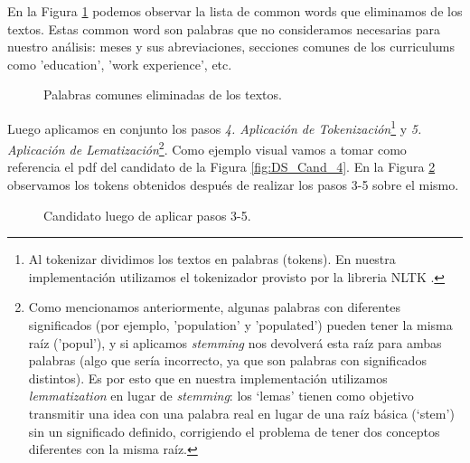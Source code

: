 \documentclass[12pt,a4paper]{article}
\begin{document}
\begin{sloppypar}
En la Figura \ref{fig:common_text} podemos observar la lista de common words que eliminamos de los textos. Estas common word son palabras que no consideramos necesarias para nuestro análisis: meses y sus abreviaciones, secciones comunes de los curriculums como 'education', 'work experience', etc. 
    
\begin{figure}[H] 
 \centering
 \noindent{}
 \caption{Palabras comunes eliminadas de los textos.} 
 \label{fig:common_text}
\end{figure}

Luego aplicamos en conjunto los pasos \textit{4. Aplicación de Tokenización}\footnote{Al tokenizar dividimos los textos en palabras (tokens). En nuestra implementación utilizamos el tokenizador provisto por la libreria NLTK .} y \textit{5. Aplicación de Lematización}\footnote{Como mencionamos anteriormente, algunas palabras con diferentes significados (por ejemplo, 'population' y 'populated') pueden tener la misma raíz ('popul'), y si aplicamos \textit{stemming} nos devolverá esta raíz para ambas palabras (algo que sería incorrecto, ya que son palabras con significados distintos). Es por esto que en nuestra implementación utilizamos \textit{lemmatization} en lugar de \textit{stemming}: los ‘lemas’ tienen como objetivo transmitir una idea con una palabra real en lugar de una raíz básica (‘stem’) sin un significado definido, corrigiendo el problema de tener dos conceptos diferentes con la misma raíz.}. Como ejemplo visual vamos a tomar como referencia el pdf del candidato de la Figura \ref{fig:DS_Cand_4}. En la Figura \ref{fig:tokens_obt} observamos los tokens obtenidos después de realizar los pasos 3-5 sobre el mismo. 

\begin{figure}[H] 
 \centering
 \noindent{}
 \caption{Candidato luego de aplicar pasos 3-5.} 
 \label{fig:tokens_obt}
\end{figure}


\end{sloppypar}
\end{document}
